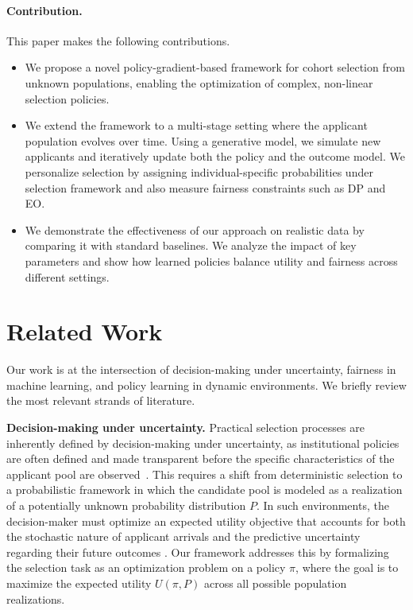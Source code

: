 \documentclass[acmlarge]{acmart-ecaf}
\begin{document}
\paragraph{Contribution.}
This paper makes the following contributions.
\begin{itemize}
    \item We propose a novel policy-gradient-based framework for cohort selection from unknown populations, enabling the optimization of complex, non-linear selection policies.
    \item We extend the framework to a multi-stage setting where the applicant population evolves over time. Using a generative model, we simulate new applicants and iteratively update both the policy and the outcome model. We personalize selection by assigning individual-specific probabilities under selection framework and also measure fairness constraints such as DP and EO.
    \item We demonstrate the effectiveness of our approach on realistic data by comparing it with standard baselines. We analyze the impact of key parameters and show how learned policies balance utility and fairness across different settings.
\end{itemize}



\section{Related Work}

Our work is at the intersection of decision-making under uncertainty, fairness in machine learning, and policy learning in dynamic environments. We briefly review the most relevant strands of literature.

\textbf{Decision-making under uncertainty.} Practical selection processes are inherently defined by decision-making under uncertainty, as institutional policies are often defined and made transparent before the specific characteristics of the applicant pool are observed~\cite{kochenderfer2015decision,johnson2010decision,trimmer2011decision,schultz2010decision,soroudi2013decision,faucheux1995decision,preuschoff2013decision}. This requires a shift from deterministic selection \cite{manski2004measuring} to a probabilistic framework in which the candidate pool is modeled as a realization of a potentially unknown probability distribution $P$. In such environments, the decision-maker must optimize an expected utility objective that accounts for both the stochastic nature of applicant arrivals and the predictive uncertainty regarding their future outcomes \cite{johnson2010decision,gardenfors1982unreliable}. Our framework addresses this by formalizing the selection task as an optimization problem on a  policy $\pi$, where the goal is to maximize the expected utility $U(\pi, P)$ across all possible population realizations. 
\end{document}
